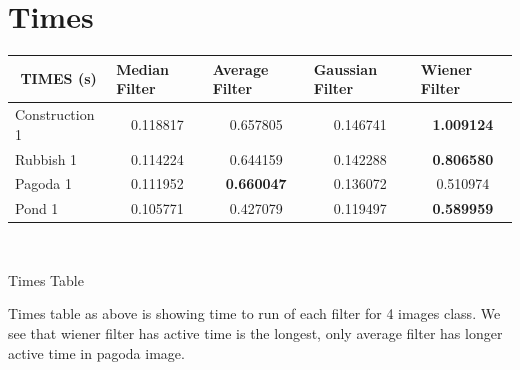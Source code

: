 \section*{Times}
\vspace{2cm}
\begin{center}

\begin{tabular}{|l|l|l|c|l|l|c|l|l|c|l|l|c|l|l|}
\hline
\multicolumn{3}{|c|}{TIMES (s)}      & \multicolumn{3}{l|}{Median Filter} & \multicolumn{3}{l|}{Average Filter}    & \multicolumn{3}{l|}{Gaussian Filter} & \multicolumn{3}{l|}{Wiener Filter}     \\ \hline
\multicolumn{3}{|l|}{Construction 1} & \multicolumn{3}{c|}{0.118817}      & \multicolumn{3}{c|}{0.657805}          & \multicolumn{3}{c|}{0.146741}        & \multicolumn{3}{c|}{\textbf{1.009124}} \\ \hline
\multicolumn{3}{|l|}{Rubbish 1}      & \multicolumn{3}{c|}{0.114224}      & \multicolumn{3}{c|}{0.644159}          & \multicolumn{3}{c|}{0.142288}        & \multicolumn{3}{c|}{\textbf{0.806580}} \\ \hline
\multicolumn{3}{|l|}{Pagoda 1}       & \multicolumn{3}{c|}{0.111952}      & \multicolumn{3}{c|}{\textbf{0.660047}} & \multicolumn{3}{c|}{0.136072}        & \multicolumn{3}{c|}{0.510974}          \\ \hline
\multicolumn{3}{|l|}{Pond 1}         & \multicolumn{3}{c|}{0.105771}      & \multicolumn{3}{c|}{0.427079}          & \multicolumn{3}{c|}{0.119497}        & \multicolumn{3}{c|}{\textbf{0.589959}} \\ \hline
\end{tabular}

\

Times Table
\end{center}
 
Times table as above is showing time to run of each filter for 4 images class. We see that wiener filter has active time is the longest, only average filter has longer active time in pagoda image.


